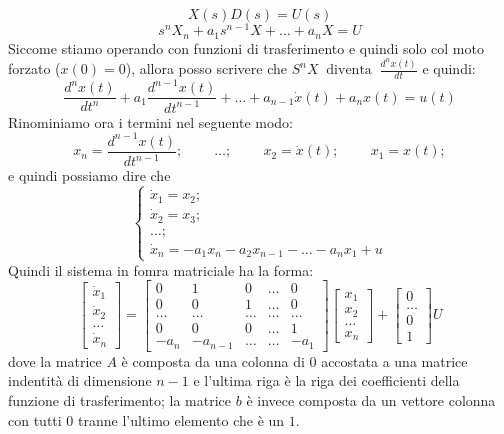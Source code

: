 \[
    X(s) D(s) = U(s)
\]
\[
    s^n X_n + a_1 s^{n-1}X + \dots + a_n X = U
\]
Siccome stiamo operando con funzioni di trasferimento e quindi solo col moto forzato ($x(0) = 0$), allora posso scrivere che $S^n X \;\;\text{diventa}\;\; \frac{d^n x(t)}{dt}$ e quindi:
\[
    \frac{d^n x(t)}{dt^n} + a_1 \frac{d^{n-1} x(t)}{dt^{n-1}} + \dots + a_{n-1} \dot{x}(t) + a_n x(t) = u(t)
\]
Rinominiamo ora i termini nel seguente modo:
\[
    x_n = \frac{d^{n-1} x(t)}{dt^{n-1}}; \;\;\;\;\;\;\;\;\dots; \;\;\;\;\;\;\;\;x_2 = \dot{x}(t); \;\;\;\;\;\;\;\;x_1 = x(t);
\]
e quindi possiamo dire che 
\[
    \begin{cases}
        \dot{x}_1 = x_2;\\
        \dot{x}_2 = x_3;\\
        \dots;\\
        \dot{x}_n = -a_1 x_n - a_2 x_{n-1} - \dots - a_n x_1 + u
    \end{cases}
\]
Quindi il sistema in fomra matriciale ha la forma:
\[
    \left[\begin{matrix}
        \dot{x}_1\\
        \dot{x}_2\\
        \dots\\
        \dot{x}_n
    \end{matrix}\right] = \left[\begin{matrix}
        0 & 1 & 0 & \dots & 0 \\
        0 & 0 & 1 & \dots & 0 \\
        \dots & \dots &\dots&\dots&\dots\\
        0 & 0 & 0 & \dots & 1\\
        -a_n & -a_{n-1} & \dots & \dots & -a_1
    \end{matrix}\right] \left[\begin{matrix}
        x_1\\x_2\\\dots\\x_n
    \end{matrix}\right] + \left[\begin{matrix}
        0\\\dots\\0\\1
    \end{matrix}\right] U
\]
dove la matrice $A$ è composta da una colonna di $0$ accostata a una matrice indentità di dimensione $n-1$ e l'ultima riga è la riga dei coefficienti della funzione di trasferimento; la matrice $b$ è invece composta da un vettore colonna con tutti $0$ tranne l'ultimo elemento che è un $1$.